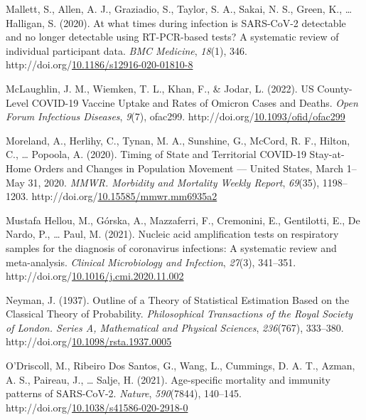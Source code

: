 \documentclass[12pt,twoside]{smiththesis}
\newlength{\cslhangindent}
\newenvironment{CSLReferences}[2] %
 {%
\setlength{\parindent}{0pt}
\ifodd #1 \everypar{\setlength{\hangindent}{\cslhangindent}}\ignorespaces\fi
\ifnum #2 > 0
\setlength{\parskip}{#2\baselineskip}
  \fi
}%
{}
\begin{document}
\begin{CSLReferences}{1}{0}
\leavevmode{}%
Mallett, S., Allen, A. J., Graziadio, S., Taylor, S. A., Sakai, N. S., Green, K., \ldots{} Halligan, S. (2020). At what times during infection is {SARS-CoV-2} detectable and no longer detectable using {RT-PCR-based} tests? {A} systematic review of individual participant data. \emph{BMC Medicine}, \emph{18}(1), 346. http://doi.org/\href{https://doi.org/10.1186/s12916-020-01810-8}{10.1186/s12916-020-01810-8}

\leavevmode{}%
McLaughlin, J. M., Wiemken, T. L., Khan, F., \& Jodar, L. (2022). {US County-Level COVID-19 Vaccine Uptake} and {Rates} of {Omicron Cases} and {Deaths}. \emph{Open Forum Infectious Diseases}, \emph{9}(7), ofac299. http://doi.org/\href{https://doi.org/10.1093/ofid/ofac299}{10.1093/ofid/ofac299}

\leavevmode{}%
Moreland, A., Herlihy, C., Tynan, M. A., Sunshine, G., McCord, R. F., Hilton, C., \ldots{} Popoola, A. (2020). Timing of {State} and {Territorial COVID-19 Stay-at-Home Orders} and {Changes} in {Population Movement} --- {United States}, {March} 1--{May} 31, 2020. \emph{MMWR. Morbidity and Mortality Weekly Report}, \emph{69}(35), 1198--1203. http://doi.org/\href{https://doi.org/10.15585/mmwr.mm6935a2}{10.15585/mmwr.mm6935a2}

\leavevmode{}%
Mustafa Hellou, M., Górska, A., Mazzaferri, F., Cremonini, E., Gentilotti, E., De Nardo, P., \ldots{} Paul, M. (2021). Nucleic acid amplification tests on respiratory samples for the diagnosis of coronavirus infections: A systematic review and meta-analysis. \emph{Clinical Microbiology and Infection}, \emph{27}(3), 341--351. http://doi.org/\href{https://doi.org/10.1016/j.cmi.2020.11.002}{10.1016/j.cmi.2020.11.002}

\leavevmode{}%
Neyman, J. (1937). Outline of a {Theory} of {Statistical Estimation Based} on the {Classical Theory} of {Probability}. \emph{Philosophical Transactions of the Royal Society of London. Series A, Mathematical and Physical Sciences}, \emph{236}(767), 333--380. http://doi.org/\href{https://doi.org/10.1098/rsta.1937.0005}{10.1098/rsta.1937.0005}

\leavevmode{}%
O'Driscoll, M., Ribeiro Dos Santos, G., Wang, L., Cummings, D. A. T., Azman, A. S., Paireau, J., \ldots{} Salje, H. (2021). Age-specific mortality and immunity patterns of {SARS-CoV-2}. \emph{Nature}, \emph{590}(7844), 140--145. http://doi.org/\href{https://doi.org/10.1038/s41586-020-2918-0}{10.1038/s41586-020-2918-0}


\end{CSLReferences}
\end{document}
